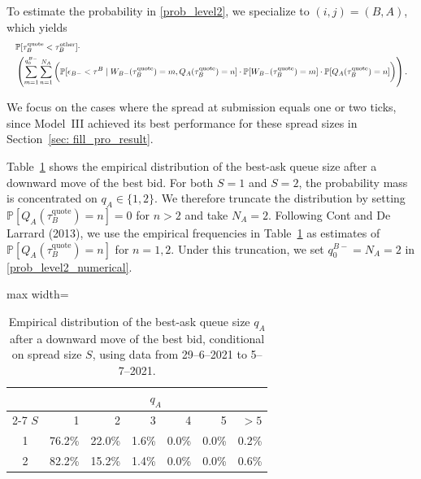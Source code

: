 \documentclass[11pt]{article}
\begin{document}
To estimate the probability in \eqref{prob_level2}, we specialize to $(i,j)=(B,A)$, which yields
\begin{equation}\label{prob_level2_numerical}
\resizebox{1.0\hsize}{!}{$
    \begin{aligned}
        &\mathbb{P}[\tau_B^\text{quote}<\tau_B^\text{other}]\cdot\\
        &\left(\sum_{m=1}^{q_0^{B-}}\sum_{n=1}^{N_A}\bigg(\mathbb{P}[\epsilon_{B-}<\tau^B \mid W_{B-}(\tau_B^\text{quote})=m,Q_{A}(\tau_B^\text{quote})=n]\cdot\mathbb{P}[W_{B-}(\tau_B^\text{quote})=m]\cdot\mathbb{P}[Q_{A}(\tau_B^\text{quote})=n]\bigg)\right).
    \end{aligned}
$}    
\end{equation}

We focus on the cases where the spread at submission equals one or two ticks, since Model~III achieved its best performance for these spread sizes in Section~\ref{sec: fill_pro_result}. 

Table~\ref{tab: quantity_ask_pricemove} shows the empirical distribution of the best-ask queue size after a downward move of the best bid. 
For both $S=1$ and $S=2$, the probability mass is concentrated on $q_A\in\{1,2\}$. 
We therefore truncate the distribution by setting $\mathbb{P}[Q_A(\tau_B^\text{quote})=n]=0$ for $n>2$ and take $N_A=2$. 
Following Cont and De Larrard (2013), we use the empirical frequencies in Table~\ref{tab: quantity_ask_pricemove} as estimates of $\mathbb{P}[Q_A(\tau_B^\text{quote})=n]$ for $n=1,2$. 
Under this truncation, we set $q_0^{B-}=N_A=2$ in \eqref{prob_level2_numerical}.

\begin{table}[h]
    \centering
        \begin{adjustbox}{max width=\textwidth}
            \begin{tabular}{c r r r r r r}\toprule
            &\multicolumn{6}{c}{$q_A$}\\ \cmidrule{2-7}
              $S$ & 1 & 2 & 3 & 4 & 5 & $>5$ \\ \midrule
              1 & 76.2\% & 22.0\% & 1.6\% & 0.0\% & 0.0\% & 0.2\% \\
              2 & 82.2\% & 15.2\% & 1.4\% & 0.0\% & 0.0\% & 0.6\% \\\bottomrule
            \end{tabular}
        \end{adjustbox}
        \caption{Empirical distribution of the best-ask queue size $q_A$ after a downward move of the best bid, conditional on spread size $S$, using data from 29--6--2021 to 5--7--2021.}   
        \label{tab: quantity_ask_pricemove}
 \end{table}
\end{document}
